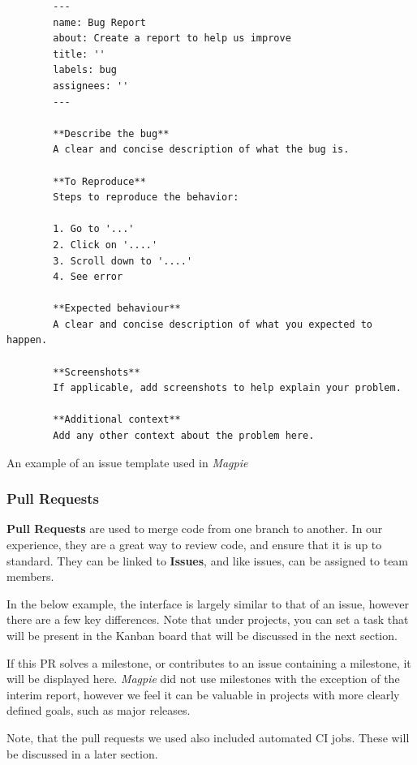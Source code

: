 \begin{listing}[htbp]
    \centering{}
    \begin{verbatim}
        ---
        name: Bug Report
        about: Create a report to help us improve
        title: ''
        labels: bug
        assignees: ''
        ---

        **Describe the bug**
        A clear and concise description of what the bug is.

        **To Reproduce**
        Steps to reproduce the behavior:

        1. Go to '...'
        2. Click on '....'
        3. Scroll down to '....'
        4. See error

        **Expected behaviour**
        A clear and concise description of what you expected to happen.

        **Screenshots**
        If applicable, add screenshots to help explain your problem.

        **Additional context**
        Add any other context about the problem here.
    \end{verbatim}
    \caption{An example of an issue template used in \textit{Magpie}}
\end{listing}

\newpage{}

\subsubsection{Pull Requests}
\textbf{Pull Requests} are used to merge code from one branch to another. In our
experience, they are a great way to review code, and ensure that it is up to
standard. They can be linked to \textbf{Issues}, and like issues, can be
assigned to team members.

In the below example, the interface is largely similar to that of an issue,
however there are a few key differences. Note that under projects, you can set a
task that will be present in the Kanban board that will be discussed in the next
section.

If this PR solves a milestone, or contributes to an issue containing a
milestone, it will be displayed here. \textit{Magpie} did not use milestones
with the exception of the interim report, however we feel it can be valuable in
projects with more clearly defined goals, such as major releases.

Note, that the pull requests we used also included automated CI jobs. These will
be discussed in a later section.

